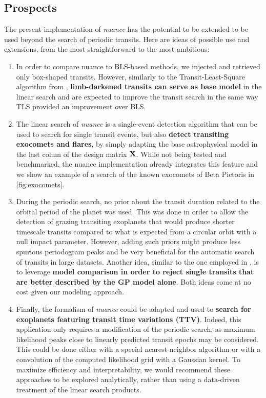 \documentclass[modern]{aastex631}
\newcommand{\nuancemethod}{\textit{nuance}}
\newcommand{\nuancecode}{\textsf{nuance}}
\begin{document}
\subsection{Prospects}
The present implementation of \nuancemethod{} has the potential to be extended to be used beyond the search of periodic transits. Here are ideas of possible use and extensions, from the most straightforward to the most ambitious:
\begin{enumerate}
    \item In order to compare \nuancecode{} to BLS-based methods, we injected and retrieved only box-shaped transits. However, similarly to the Transit-Least-Square algorithm from \cite{tls}, \textbf{limb-darkened transits can serve as base model} in the linear search and are expected to improve the transit search in the same way TLS provided an improvement over BLS.
    \item The linear search of \nuancemethod{} is a single-event detection algorithm that can be used to search for single transit events, but also \textbf{detect transiting exocomets and flares}, by simply adapting the base astrophysical model in the last colum of the design matrix $\bf{X}$. While not being tested and benchmarked, the \nuancecode{} implementation already integrates this feature and we show an example of a search of the known exocomets of Beta Pictoris in \autoref{fig:exocomets}.
    \item During the periodic search, no prior about the transit duration related to the orbital period of the planet was used. This was done in order to allow the detection of grazing transiting exoplanets that would produce shorter timescale transits compared to what is expected from a circular orbit with a null impact parameter. However, adding such priors might produce less spurious periodogram peaks and be very beneficial for the automatic search of transits in large datasets. Another idea, similar to the one employed in \cite{foreman2016}, is to leverage \textbf{model comparison in order to reject single transits that are better described by the GP model alone}. Both ideas come at no cost given our modeling approach.
    \item Finally, the formalism of \nuancemethod{} could be adapted and used to \textbf{search for exoplanets featuring transit time variations (TTV)}. Indeed, this application only requires a modification of the periodic search, as maximum likelihood peaks close to linearly predicted transit epochs may be considered. This could be done either with a special nearest-neighbor algorithm or with a convolution of the computed likelihood grid with a Gaussian kernel. To maximize efficiency and interpretability, we would recommend these approaches to be explored analytically, rather than using a data-driven treatment of the linear search products.
\end{enumerate}
\end{document}
